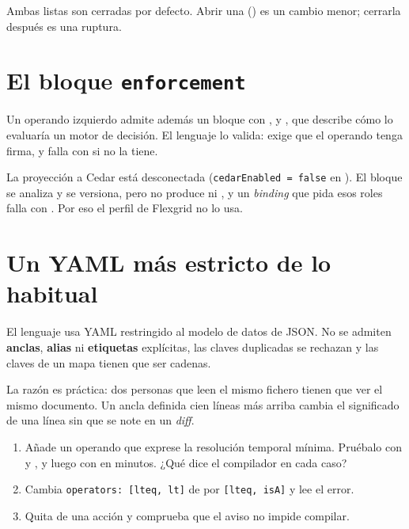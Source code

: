 Ambas listas son cerradas por defecto. Abrir una () es un cambio menor; cerrarla después es una
ruptura.

\section{El bloque \texttt{enforcement}}

Un operando izquierdo admite además un bloque  con ,  y
, que describe cómo lo evaluaría un motor de decisión. El lenguaje lo valida: exige que el
operando tenga firma, y falla con  si no la tiene.

\begin{notaPractica}
La proyección a Cedar está desconectada (\texttt{cedarEnabled = false} en ). El bloque se
analiza y se versiona, pero no produce  ni , y un \emph{binding} que
pida esos roles falla con . Por eso el perfil de Flexgrid no lo usa.
\end{notaPractica}

\section{Un YAML más estricto de lo habitual}

El lenguaje usa YAML restringido al modelo de datos de JSON. No se admiten \textbf{anclas}, \textbf{alias} ni
\textbf{etiquetas} explícitas, las claves duplicadas se rechazan y las claves de un mapa tienen que ser cadenas.

La razón es práctica: dos personas que leen el mismo fichero tienen que ver el mismo documento. Un ancla definida
cien líneas más arriba cambia el significado de una línea sin que se note en un \emph{diff}.

\begin{retos}
\begin{enumerate}[leftmargin=*, itemsep=2pt]
  \item Añade un operando  que exprese la resolución temporal mínima. Pruébalo con
         y , y luego con  en minutos. ¿Qué dice el compilador en cada caso?
  \item Cambia \texttt{operators: [lteq, lt]} de  por \texttt{[lteq, isA]} y lee el error.
  \item Quita  de una acción y comprueba que el aviso no impide compilar.
\end{enumerate}
\end{retos}
